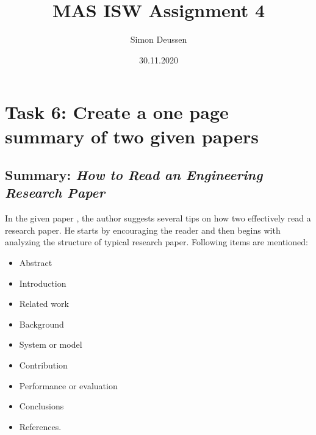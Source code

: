 \documentclass{article}
\title{MAS ISW Assignment 4}
\date{30.11.2020}
\author{Simon Deussen}
\begin{document}
  \maketitle

  \section*{Task 6: Create a one page summary of two given papers}
  \subsection*{Summary: \emph{How to Read an Engineering Research Paper}}
  
  In the given paper \cite{griswold2009read}, the author suggests several tips on how two
  effectively read a research paper. He starts by encouraging the reader and then begins with analyzing  
  the structure of typical research paper. Following items are mentioned:
  \begin{itemize}
    \item Abstract
    \item Introduction
    \item Related work 
    \item Background
    \item System or model
    \item Contribution
    \item Performance or evaluation
    \item Conclusions
    \item References.
  \end{itemize}
\end{document}
